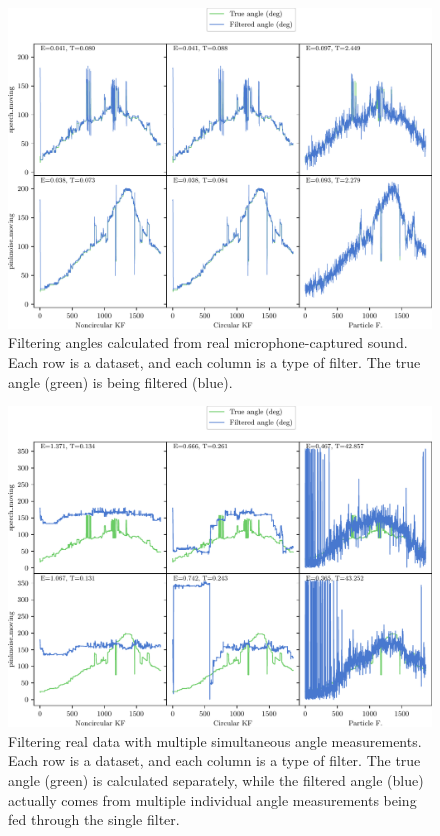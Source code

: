 \documentclass[11pt]{amsart}
\begin{document}
\begin{figure}[htp]
    \centering
    \includegraphics[width=.95\textwidth]{actual_paper_graphs/all_real.pdf}\hfill
    \caption{Filtering angles calculated from real microphone-captured sound. Each row is a dataset, and each column is a type of filter. The true angle (green) is being filtered (blue).}
    \label{fig:all_real}
\end{figure}

\begin{figure}[htp]
    \centering
    \includegraphics[width=.95\textwidth]{actual_paper_graphs/multiple_angles.pdf}\hfill
    \caption{Filtering real data with multiple simultaneous angle measurements. Each row is a dataset, and each column is a type of filter. The true angle (green) is calculated separately, while the filtered angle (blue) actually comes from multiple individual angle measurements being fed through the single filter.}
    \label{fig:multiple_angles}
\end{figure}
\end{document}
